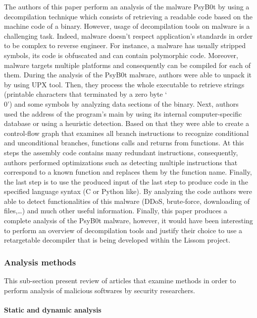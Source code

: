 The authors of this paper perform an analysis of the malware PsyB0t by using a decompilation
technique which consists of retrieving a readable code based on the machine code of a
binary. However, usage of decompilation tools on malware is a challenging task. Indeed,
malware doesn’t respect application’s standards in order to be complex to reverse engineer.
For instance, a malware has usually stripped symbols, its code is obfuscated and can
contain polymorphic code. Moreover, malware targets multiple platforms
and consequently can be compiled for each of them. During the analysis of the PsyB0t
malware, authors were able to unpack it by using UPX tool. Then, they process the whole
executable to retrieve strings (printable characters that terminated by a zero byte ‘\\0’)
and some symbols by analyzing data sections of the binary.  Next, authors used the address
of the program’s main by using its internal computer-specific database or using a heuristic
detection. Based on that they were able to create a control-flow graph that examines all 
branch instructions to recognize conditional and unconditional branches, functions calls
and returns from functions. At this steps the assembly code contains many redundant 
instructions, consequently, authors performed optimizations such as detecting multiple 
instructions that correspond to a known function and replaces them by the function name.
Finally, the last step is to use the produced input of the last step to produce code in the
specified language syntax (C or Python like). By analyzing the code authors were able to 
detect functionalities of this malware (DDoS, brute-force, downloading of files,…) and much
other useful information.
Finally, this paper produces a complete analysis of the PsyB0t malware, however, it would 
have been interesting to perform an overview of decompilation tools and justify their 
choice to use a retargetable decompiler that is being developed within the Lissom project.

\subsubsection{Analysis methods} %

This sub-section present review of articles that examine methods in order to perform 
analysis of malicious softwares by security researchers.

\paragraph{Static and dynamic analysis} %

